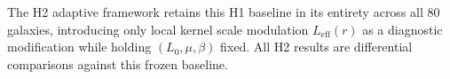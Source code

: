 \documentclass[twocolumn,linenumbers]{aastex701}
\begin{document}
The H2 adaptive framework retains this H1 baseline in its entirety across
all 80 galaxies, introducing only local kernel scale modulation
$L_{\mathrm{eff}}(r)$ as a diagnostic modification while holding
$(L_0, \mu, \beta)$ fixed. All H2 results are differential comparisons
against this frozen baseline.



\end{document}
